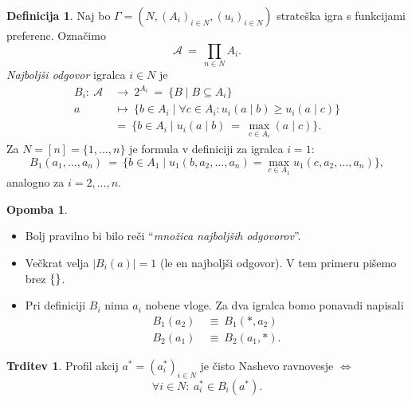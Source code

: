 \documentclass[11pt]{article}
\newcommand{\A}{\mathcal{A}}
\newcommand{\set}[1]{\{#1\}}
\theoremstyle{definition}
\newtheorem{definicija}{Definicija}[section]
\theoremstyle{definition}
\newtheorem{trditev}{Trditev}[section]
\theoremstyle{definition}
\theoremstyle{definition}
\newtheorem*{opomba}{Opomba}
\begin{document}
\pagebreak

\begin{definicija}

Naj bo $\Gamma = (N, (A_i)_{i \in N}, (u_i)_{i \in N})$ strateška igra s funkcijami preferenc. Označimo
$$\A ~=~ \prod_{n \in N} A_i.$$
\textit{Najboljši odgovor} igralca $i \in N$ je 
\begin{align*}
B_i: ~\A ~&\rightarrow~ 2^{A_i} ~=~ \set{B \mid B \subseteq A_i} \\
a ~&\mapsto~ \set{b \in A_i \mid \forall c \in A_i: u_i(a \mid b) \geq u_i(a \mid c)} \\
&=~ \set{b \in A_i \mid u_i(a \mid b) ~=~ \max_{c \in A_i}(a \mid c)}.
\end{align*}
Za $N = [n] = \set{1,\ldots,n}$ je formula v definiciji za igralca $i=1:$
$$B_1(a_1,\ldots,a_n) ~=~ \set{b \in A_1 \mid u_1(b,a_2,\ldots,a_n) = \max_{c \in A_1} u_1(c,a_2,\ldots,a_n)},$$
analogno za $i=2,\ldots,n$.

\end{definicija}
\vspace{0.5cm}

\begin{opomba}
~
\begin{itemize}
	\item Bolj pravilno bi bilo reči ``\textit{množica najboljših odgovorov}''.
	\item Večkrat velja $|B_i(a)|=1$ (le en najboljši odgovor). V tem primeru pišemo brez $\set$.
	\item Pri definiciji $B_i$ nima $a_i$ nobene vloge. Za dva igralca bomo ponavadi napisali
	\begin{align*}
	B_1(a_2) ~&\equiv~ B_1(*,a_2) \\
	B_2(a_1) ~&\equiv~ B_2(a_1,*).
	\end{align*}
\end{itemize}

\end{opomba} 
\vspace{0.5cm}

\begin{trditev}

Profil akcij $a^* = (a_i^*)_{i \in N}$ je čisto Nashevo ravnovesje $\iff$
$$\forall i \in N: ~a_i^* \in B_i(a^*).$$

\end{trditev}
\vspace{0.5cm}

\pagebreak
\end{document}
